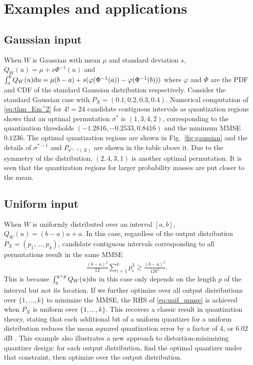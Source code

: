 \documentclass[conference]{IEEEtran}
\def\rd{{\rm d}}
\begin{document}
\section{Examples and applications}
\subsection{Gaussian input}
When $W$ is Gaussian with mean $\mu$ and standard deviation $s$, 
$   Q_W(u) = \mu + s \Phi^{-1}(u)$
and
$    \int_a^b Q_W(u) \rd u = \mu (b-a) + s(\varphi(\Phi^{-1}(a)) - \varphi(\Phi^{-1}(b))) $
where $\varphi$ and $\Phi$ are the PDF and CDF of the standard Gaussian distribution respectively.
Consider the standard Gaussian case with $P_X = (0.1, 0.2, 0.3, 0.4)$.
Numerical computation of \eqref{eq:thm_Em^2} for $4!=24$ candidate contiguous intervals as quantization regions shows that an optimal permutation $\sigma^*$ is $(1,3,4,2)$, corresponding to the quantization thresholds $(-1.2816, -0.2533, 0.8416)$ and the minimum MMSE $0.1236$.
The optimal quantization regions are shown in Fig.~\ref{fig:gaussian} and the details of $\sigma^{*-1}$ and $P_{\sigma^{*-1}(X)}$ are shown in the table above it. Due to the symmetry of the distribution, $(2,4,3,1)$ is another optimal permutation. It is seen that the quantization regions for larger probability masses are put closer to the mean.

\subsection{Uniform input}
When $W$ is uniformly distributed over an interval $[a,b]$, $ Q_W(u) = (b-a)u+a .   $
In this case, regardless of the output distribution $P_X=(p_1,\ldots,p_k)$, candidate contiguous intervals corresponding to all permutations result in the same MMSE 
\begin{align}
    \frac{(b-a)^2}{12}\sum_{i=1}^k p_i^3 \ge \frac{(b-a)^2}{12k^2} . \label{eq:unif_mmse}
\end{align}
This is because $\int_q^{q+p} Q_W(u)\rd u$ in this case only depends on the length $p$ of the interval but not its location.
If we further optimize over all output distributions over $\{1,\ldots,k\}$ to minimize the MMSE, the RHS of \eqref{eq:unif_mmse} is achieved when $P_X$ is uniform over $\{1,\ldots,k\}$.
This recovers a classic result in quantization theory, stating that each additional bit of a uniform quantizer for a uniform distribution reduces the mean squared quantization error by a factor of $4$, or $6.02$ dB \cite{quant_1998}.
This example also illustrates a new approach to distortion-minimizing quantizer design: for each output distribution, find the optimal quantizer under that constraint, then optimize over the output distribution.
\end{document}
